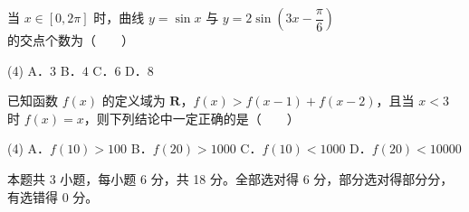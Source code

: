 \begin{question}
当 $x\in[0,2\pi]$ 时，曲线 $y=\sin x$ 与 $y=2\sin\left(3x-\dfrac{\pi}{6}\right)$ 的交点个数为（　　）

\begin{gkopts}(4)
\task A．$3$
\task B．$4$
\task C．$6$
\task D．$8$
\end{gkopts}

\end{question}
\begin{question}
已知函数 $f(x)$ 的定义域为 $\mathbf R$，$f(x)>f(x-1)+f(x-2)$，且当 $x<3$ 时 $f(x)=x$，则下列结论中一定正确的是（　　）

\begin{gkopts}(4)
\task A．$f(10)>100$
\task B．$f(20)>1000$
\task C．$f(10)<1000$
\task D．$f(20)<10000$
\end{gkopts}

\par\medskip

\end{question}

\begin{gktip}
本题共 3 小题，每小题 6 分，共 18 分。全部选对得 6 分，部分选对得部分分，有选错得 0 分。
\end{gktip}

